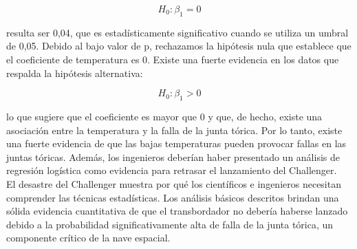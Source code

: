 \begin{equation} 
H_0 : \beta_1 = 0
\end{equation} 


resulta ser 0,04, que es estad\'isticamente significativo cuando se utiliza un
umbral de 0,05. Debido al bajo valor de p, rechazamos la hip\'otesis nula que
establece que el coeficiente de temperatura es 0. Existe una fuerte evidencia en
los datos que respalda la hip\'otesis alternativa:

\begin{equation}  
H_0 : \beta_1 > 0
\end{equation} 


lo que sugiere que el coeficiente es mayor que 0 y que, de hecho, existe una
asociaci\'on entre la temperatura y la falla de la junta t\'orica. Por lo tanto,
existe una fuerte evidencia de que las bajas temperaturas pueden provocar fallas
en las juntas t\'oricas. Adem\'as, los ingenieros deber\'ian haber presentado un
an\'alisis de regresi\'on log\'istica como evidencia para retrasar el
lanzamiento del Challenger.\\

El desastre del Challenger muestra por qu\'e los cient\'ificos e ingenieros
necesitan comprender las t\'ecnicas estad\'isticas. Los an\'alisis b\'asicos
descritos brindan una s\'olida evidencia cuantitativa de que el transbordador no
deber\'ia haberse lanzado debido a la probabilidad significativamente alta de
falla de la junta t\'orica, un componente cr\'itico de la nave espacial.\\

